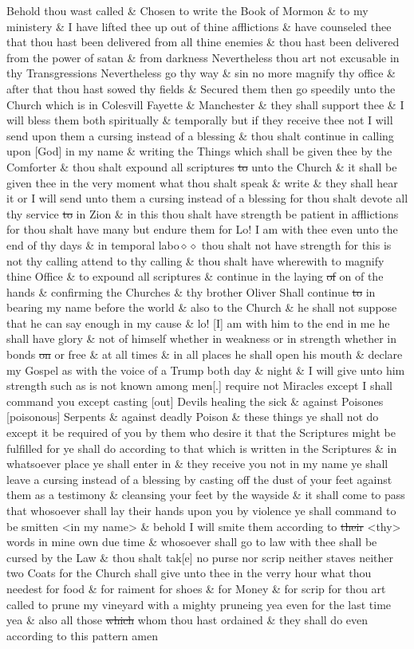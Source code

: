 				Behold thou wast called \& Chosen to write the Book of Mormon \& to my ministery \& I have lifted thee up out of thine afflictions \& have counseled thee that thou hast been delivered from all thine enemies \& thou hast been delivered from the power of satan \& from darkness Nevertheless thou art not excusable in thy Transgressions Nevertheless go thy way \& sin no more magnify thy office \& after that thou hast sowed thy fields \& Secured them then go speedily unto the Church which is in Colesvill Fayette \& Manchester \& they shall support thee \& I will bless them both spiritually \& temporally but if they receive thee not I will send upon them a cursing instead of a blessing \& thou shalt continue in calling upon [God] in my name \& writing the Things which shall be given thee by the Comforter \& thou shalt expound all scriptures \sout{to} unto the Church \& it shall be given thee in the very moment what thou shalt speak \& write \& they shall hear it or I will send unto them a cursing instead of a blessing for thou shalt devote all thy service \sout{to} in Zion \& in this thou shalt have strength be patient in afflictions for thou shalt have many but endure them for Lo! I am with thee even unto the end of thy days \& in temporal labo$\diamond\diamond$ thou shalt not have strength for this is not thy calling attend to thy calling \& thou shalt have wherewith to magnify thine Office \& to expound all scriptures \& continue in the laying \sout{of} on of the hands \& confirming the Churches \& thy brother Oliver Shall continue \sout{to} in bearing my name before the world \& also to the Church \& he shall not suppose that he can say enough in my cause \& lo! [I] am with him to the end in me he shall have glory \& not of himself whether in weakness or in strength whether in bonds \sout{on} or free \& at all times \& in all places he shall open his mouth \& declare my Gospel as with the voice of a Trump both day \& night \& I will give unto him strength such as is not known among men[.] require not Miracles except I shall command you except casting [out] Devils healing the sick \& against Poisones [poisonous] Serpents \& against deadly Poison \& these things ye shall not do except it be required of you by them who desire it that the Scriptures might be fulfilled for ye shall do according to that which is written in the Scriptures \& in whatsoever place ye shall enter in \& they receive you not in my name ye shall leave a cursing instead of a blessing by casting off the dust of your feet against them as a testimony \& cleansing your feet by the wayside \& it shall come to pass that whosoever shall lay their hands upon you by violence ye shall command to be smitten <in my name> \& behold I will smite them according to \sout{their} <thy> words in mine own due time \& whosoever shall go to law with thee shall be cursed by the Law \& thou shalt tak[e] no purse nor scrip neither staves neither two Coats for the Church shall give unto thee in the verry hour what thou needest for food \& for raiment for shoes \& for Money \& for scrip for thou art called to prune my vineyard with a mighty pruneing yea even for the last time yea \& also all those \sout{which} whom thou hast ordained \& they shall do even according to this pattern amen
				
